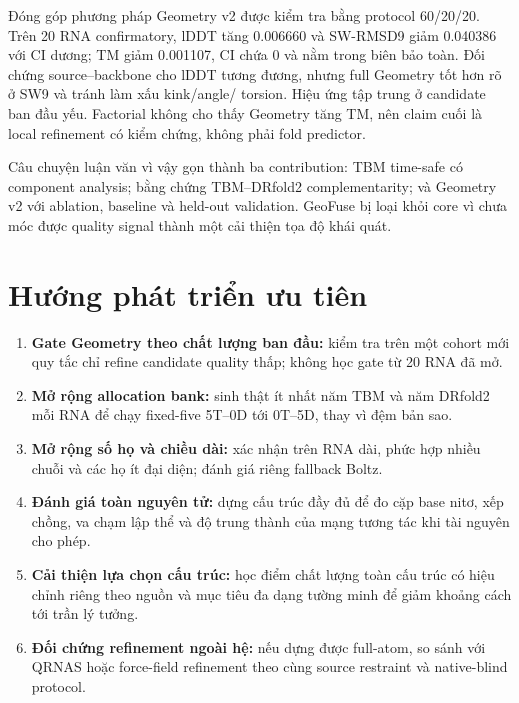 \documentclass[12pt,a4paper,oneside]{report}
\newcommand{\angstrom}{\text{\AA}}
\begin{document}
Đóng góp phương pháp Geometry v2 được kiểm tra bằng protocol 60/20/20. Trên 20 RNA
confirmatory, lDDT tăng 0.006660 và SW-RMSD9 giảm 0.040386~\angstrom{} với CI dương;
TM giảm 0.001107, CI chứa 0 và nằm trong biên bảo toàn. Đối chứng source--backbone cho
lDDT tương đương, nhưng full Geometry tốt hơn rõ ở SW9 và tránh làm xấu kink/angle/
torsion. Hiệu ứng tập trung ở candidate ban đầu yếu. Factorial không cho thấy Geometry
tăng TM, nên claim cuối là local refinement có kiểm chứng, không phải fold predictor.

Câu chuyện luận văn vì vậy gọn thành ba contribution: TBM time-safe có component
analysis; bằng chứng TBM--DRfold2 complementarity; và Geometry v2 với ablation,
baseline và held-out validation. GeoFuse bị loại khỏi core vì chưa móc được quality
signal thành một cải thiện tọa độ khái quát.

\section{Hướng phát triển ưu tiên}

\begin{enumerate}
  \item \textbf{Gate Geometry theo chất lượng ban đầu:} kiểm tra trên một cohort mới
  quy tắc chỉ refine candidate quality thấp; không học gate từ 20 RNA đã mở.
  \item \textbf{Mở rộng allocation bank:} sinh thật ít nhất năm TBM và năm DRfold2 mỗi
  RNA để chạy fixed-five 5T--0D tới 0T--5D, thay vì đệm bản sao.
  \item \textbf{Mở rộng số họ và chiều dài:} xác nhận trên RNA dài, phức hợp nhiều chuỗi
  và các họ ít đại diện; đánh giá riêng fallback Boltz.
  \item \textbf{Đánh giá toàn nguyên tử:} dựng cấu trúc đầy đủ để đo cặp base nitơ, xếp chồng,
  va chạm lập thể và độ trung thành của mạng tương tác khi tài nguyên cho phép.
  \item \textbf{Cải thiện lựa chọn cấu trúc:} học điểm chất lượng toàn cấu trúc có hiệu
  chỉnh riêng theo nguồn và mục tiêu đa dạng tường minh để giảm khoảng cách tới trần lý tưởng.
  \item \textbf{Đối chứng refinement ngoài hệ:} nếu dựng được full-atom, so sánh với
  QRNAS hoặc force-field refinement theo cùng source restraint và native-blind protocol.
\end{enumerate}

\appendix
\end{document}
